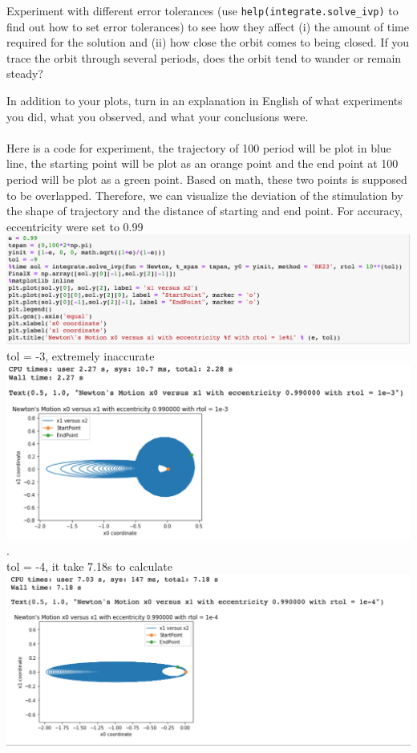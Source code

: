 \documentclass[11pt]{article}
\begin{document}
Experiment with different error tolerances 
(use {\tt help(integrate.solve\_ivp)} to find out how to set error tolerances)
to see how they affect 
(i)  the amount of time required for the solution and 
(ii) how close the orbit comes to being closed.
If you trace the orbit through several periods, 
does the orbit tend to wander or remain steady?
\par
In addition to your plots, 
turn in an explanation in English of what experiments you did,
what you observed, and what your conclusions were.\\
\\Here is a code for experiment, the trajectory of 100 period will be plot in blue line, the starting point will be plot as an orange point and the end point at 100 period will be plot as a green point. Based on math, these two points is supposed to be overlapped. Therefore, we can visualize the deviation of the stimulation by the shape of trajectory and the distance of starting and end point. For accuracy, eccentricity were set to 0.99\\
\includegraphics[scale = 0.6]{lab}\\
tol = -3, extremely inaccurate\\
\includegraphics[scale = 0.8]{3}\newpage .\\
tol = -4, it take 7.18s to calculate\\
\includegraphics[scale = 0.8]{4}
\end{document}
